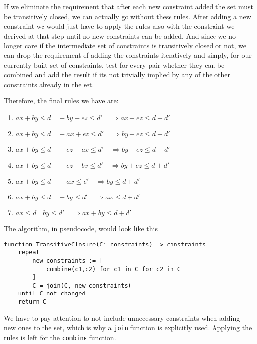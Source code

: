 If we eliminate the requirement that after each new constraint added the set must be 
transitively closed, we can actually go without these rules. After adding a new 
constraint we would just have to apply the rules also with the constraint we derived at
that step until no new constraints can be added. And since we no longer care if the
intermediate set of constraints is transitively closed or not, we can drop the 
requirement of adding the constraints iteratively and simply, for our currently built
set of constraints, test for every pair whether they can be combined and add the 
result if its not trivially implied by any of the other constraints already in the 
set.

Therefore, the final rules we have are:
\begin{enumerate}[label={\small \boxed{\textbf{R{\arabic*}}}}]
    \item\label{rule:R1}
    $ax + by \le d \quad -by + ez \le d' \quad\Longrightarrow ax + ez \le d + d'$
    \item\label{rule:R2}
    $ax + by \le d \quad -ax + ez \le d' \quad\Longrightarrow by + ez \le d + d'$
    \item\label{rule:R3}
    $ax + by \le d \quad \phantom{-}ez - ax  \le d' \quad\Longrightarrow by + ez \le d + d'$
    \item\label{rule:R4}
    $ax + by \le d \quad \phantom{-}ez - bx  \le d' \quad\Longrightarrow by + ez \le d + d'$
    \item\label{rule:R5}
    $ax + by \le d \quad -ax \le d' \quad\Longrightarrow by \le d + d'$
    \item\label{rule:R6}
    $ax + by \le d \quad -by \le d' \quad\Longrightarrow ax \le d + d'$
    \item\label{rule:R7}
    $ax \le d \quad by \le d' \quad\Longrightarrow ax + by \le d + d'$
\end{enumerate}

The algorithm, in pseudocode, would look like this
\begin{verbatim}
function TransitiveClosure(C: constraints) -> constraints
    repeat
        new_constraints := [
            combine(c1,c2) for c1 in C for c2 in C
        ]
        C = join(C, new_constraints)
    until C not changed
    return C
\end{verbatim}
\noindent We have to pay attention to not include unnecessary constraints when adding
new ones to the set, which is why a \texttt{join} function is explicitly used.
Applying the rules is left for the \texttt{combine} function.

